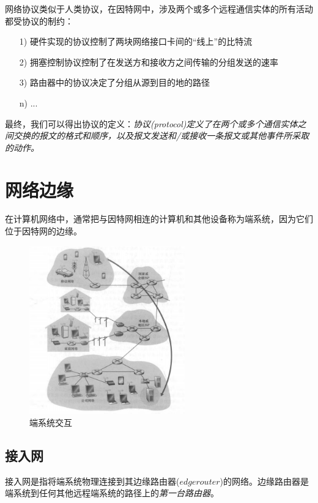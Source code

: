     网络协议类似于人类协议，在因特网中，涉及两个或多个远程通信实体的所有活动都受协议的制约：

\begin{itemize}
    \item [1)] 硬件实现的协议控制了两块网络接口卡间的“线上”的比特流
    \item [2)] 拥塞控制协议控制了在发送方和接收方之间传输的分组发送的速率
    \item [3)] 路由器中的协议决定了分组从源到目的地的路径
    \item [n)] ...
\end{itemize}

    最终，我们可以得出协议的定义：\emph{协议(protocol)定义了在两个或多个通信实体之间交换的报文的格式和顺序，以及报文发送和/或接收一条报文或其他事件所采取的动作。}

\section{网络边缘}

    在计算机网络中，通常把与因特网相连的计算机和其他设备称为端系统，因为它们位于因特网的边缘。

\begin{figure}[!htbp]
    \centering
    \includegraphics[width=0.6\textwidth]{image/chapter01/网络边缘.png}
    \caption{端系统交互}
\end{figure}

\subsection{接入网}

    接入网是指将端系统物理连接到其边缘路由器($edge router$)的网络。边缘路由器是端系统到任何其他远程端系统的路径上的\emph{第一台路由器}。

